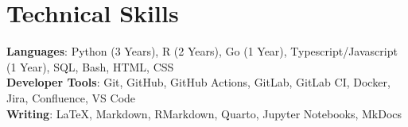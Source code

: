 \section{Technical Skills}

\begin{itemize}[leftmargin=0.15in, label={}]
    \small{\item{
                    \textbf{Languages}{: Python (3 Years), R (2 Years), Go (1 Year), Typescript/Javascript (1 Year), SQL, Bash, HTML, CSS} \\
                    \textbf{Developer Tools}{: Git, GitHub, GitHub Actions, GitLab, GitLab CI, Docker, Jira, Confluence, VS Code} \\
                    \textbf{Writing}{: LaTeX, Markdown, RMarkdown, Quarto, Jupyter Notebooks, MkDocs}
              }}
\end{itemize}
